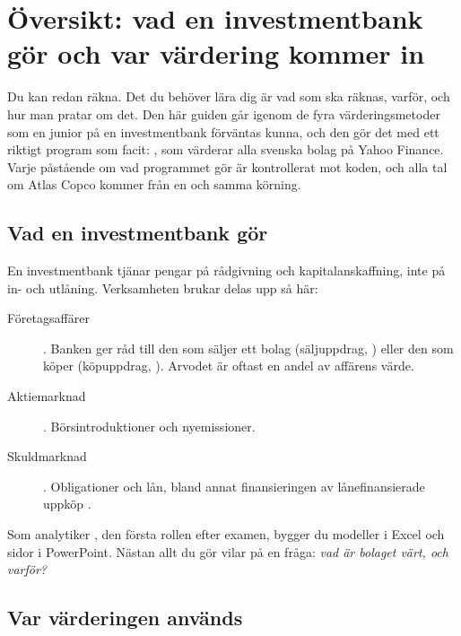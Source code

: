\section{Översikt: vad en investmentbank gör och var värdering kommer in}
\label{sec:oversikt}

Du kan redan räkna. Det du behöver lära dig är vad som ska räknas, varför, och hur man pratar om
det. Den här guiden går igenom de fyra värderingsmetoder som en junior på en investmentbank
förväntas kunna, och den gör det med ett riktigt program som facit: , som
värderar alla svenska bolag på Yahoo Finance. Varje påstående om vad programmet gör är
kontrollerat mot koden, och alla tal om Atlas Copco kommer från en och samma körning.

\subsection{Vad en investmentbank gör}

En investmentbank  tjänar pengar på rådgivning och kapitalanskaffning, inte
på in- och utlåning. Verksamheten brukar delas upp så här:

\begin{description}
  \item[Företagsaffärer] . Banken ger råd till den som säljer
    ett bolag (säljuppdrag, ) eller den som köper (köpuppdrag, ).
    Arvodet är oftast en andel av affärens värde.
  \item[Aktiemarknad] . Börsintroduktioner  och nyemissioner.
  \item[Skuldmarknad] . Obligationer och lån, bland annat
    finansieringen av lånefinansierade uppköp .
\end{description}

Som analytiker , den första rollen efter examen, bygger du modeller i Excel och
sidor i PowerPoint. Nästan allt du gör vilar på en fråga: \emph{vad är bolaget värt, och varför?}

\subsection{Var värderingen används}

